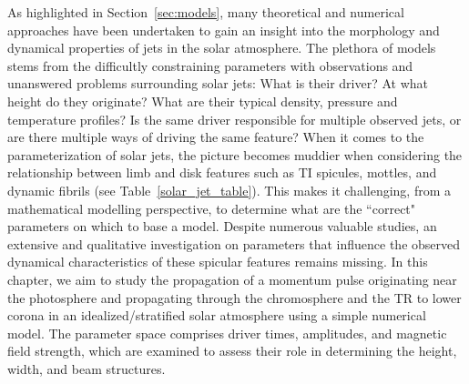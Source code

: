 As highlighted in Section~\ref{sec:models}, many theoretical and numerical approaches have been undertaken to gain an insight into the morphology and dynamical properties of jets in the solar atmosphere. The plethora of models stems from the difficultly constraining parameters with observations and unanswered problems surrounding solar jets: What is their driver? At what height do they originate? What are their typical density, pressure and temperature profiles? Is the same driver responsible for multiple observed jets, or are there multiple ways of driving the same feature? When it comes to the parameterization of solar jets, the picture becomes muddier when considering the relationship between limb and disk features such as TI spicules, mottles, and dynamic fibrils (see Table~\ref{solar_jet_table}). This makes it challenging, from a mathematical modelling perspective, to determine what are the ``correct" parameters on which to base a model. Despite numerous valuable studies, an extensive and qualitative investigation on parameters that influence the observed dynamical characteristics of these spicular features remains missing. In this chapter, we aim to study the propagation of a momentum pulse originating near the photosphere and propagating through the chromosphere and the TR to lower corona in an idealized/stratified solar atmosphere using a simple numerical model. The parameter space comprises driver times, amplitudes, and magnetic field strength, which are examined to assess their role in determining the height, width, and beam structures.
